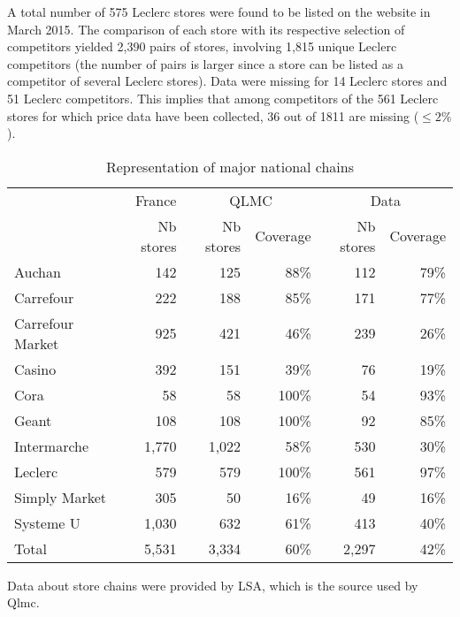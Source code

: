\documentclass[english]{article}
\begin{document}
A total number of 575 Leclerc stores were found to be listed on the website in March 2015. The comparison of each store with its respective selection of competitors yielded 2,390 pairs of stores, involving 1,815 unique Leclerc competitors (the number of pairs is larger since a store can be listed as a competitor of several Leclerc stores). Data were missing for 14 Leclerc stores and 51 Leclerc competitors. This implies that among competitors of the 561 Leclerc stores for which price data have been collected, 36 out of 1811 are missing ($\le 2 \%$).

\begin{table}[H]
\begin{threeparttable}
\renewcommand{\arraystretch}{0.7}%
\caption{Representation of major national chains}
\label{tab:qlmc_chain_repr}
\small
\begin{tabular}{lr|rr|rr}
\toprule
          & France & \multicolumn{2}{c|}{QLMC} & \multicolumn{2}{c}{Data} \\
          & Nb stores & Nb stores & Coverage & Nb stores & Coverage \\
\midrule
    Auchan & 142   & 125   & 88\%  & 112   & 79\% \\
    Carrefour & 222   & 188   & 85\%  & 171   & 77\% \\
    Carrefour Market & 925   & 421   & 46\%  & 239   & 26\% \\
    Casino & 392   & 151   & 39\%  & 76    & 19\% \\
    Cora  & 58    & 58    & 100\% & 54    & 93\% \\
    Geant & 108   & 108   & 100\% & 92    & 85\% \\
    Intermarche & 1,770 & 1,022 & 58\%  & 530   & 30\% \\
    Leclerc & 579   & 579   & 100\% & 561   & 97\% \\
    Simply Market & 305   & 50    & 16\%  & 49    & 16\% \\
    Systeme U & 1,030 & 632   & 61\%  & 413   & 40\% \\
\midrule		
    Total & 5,531 & 3,334 & 60\%  & 2,297 & 42\% \\
\bottomrule
\bottomrule
\end{tabular}
\begin{tablenotes}
      \small
      \item Data about store chains were provided by LSA, which is the source used by Qlmc.
\end{tablenotes}
\end{threeparttable}
\end{table}
\end{document}
